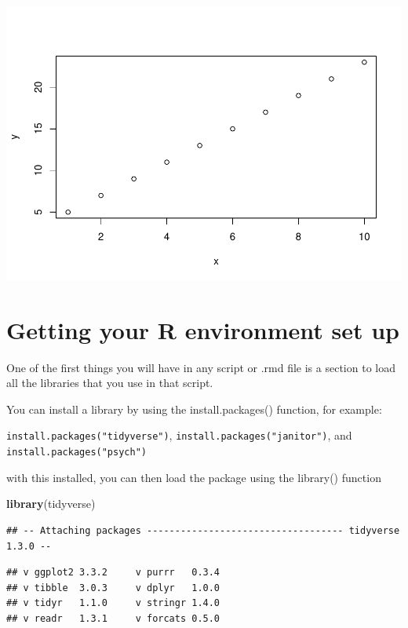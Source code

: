 \documentclass[
]{book}
\newenvironment{Shaded}{\begin{snugshade}}{\end{snugshade}}
\newcommand{\KeywordTok}[1]{\textcolor[rgb]{0.13,0.29,0.53}{\textbf{#1}}}
\newcommand{\NormalTok}[1]{#1}
\begin{document}
\includegraphics{test_course_notes_files/figure-latex/unnamed-chunk-2-1.pdf}

\hypertarget{getting-your-r-environment-set-up}{%
\section{Getting your R environment set up}\label{getting-your-r-environment-set-up}}

One of the first things you will have in any script or .rmd file is a section to load all the libraries that you use in that script.

You can install a library by using the install.packages() function, for example:

\texttt{install.packages("tidyverse")}, \texttt{install.packages("janitor")}, and \texttt{install.packages("psych")}

with this installed, you can then load the package using the library() function

\begin{Shaded}
\begin{Highlighting}[]
\KeywordTok{library}\NormalTok{(tidyverse)}
\end{Highlighting}
\end{Shaded}

\begin{verbatim}
## -- Attaching packages ----------------------------------- tidyverse 1.3.0 --
\end{verbatim}

\begin{verbatim}
## v ggplot2 3.3.2     v purrr   0.3.4
## v tibble  3.0.3     v dplyr   1.0.0
## v tidyr   1.1.0     v stringr 1.4.0
## v readr   1.3.1     v forcats 0.5.0
\end{verbatim}
\end{document}
